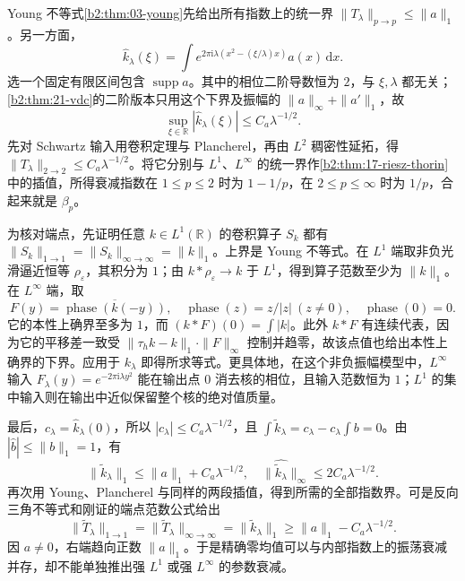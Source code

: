 \begin{solution}
Young 不等式\cref{b2:thm:03-young}先给出所有指数上的统一界 \(\|T_\lambda\|_{p\to p}\leq\|a\|_1\)。另一方面，
\[
 \widehat k_\lambda(\xi)
 =\int e^{2\pi\mathrm i\lambda(x^2-(\xi/\lambda)x)}a(x)\,\mathrm dx.
\]
选一个固定有限区间包含 \(\operatorname{supp}a\)。其中的相位二阶导数恒为 \(2\)，与 \(\xi,\lambda\) 都无关；\cref{b2:thm:21-vdc}的二阶版本只用这个下界及振幅的 \(\|a\|_\infty+\|a'\|_1\)，故
\[
 \sup_{\xi\in\mathbb R}|\widehat k_\lambda(\xi)|\leq C_a\lambda^{-1/2}.
\]
先对 Schwartz 输入用卷积定理与 Plancherel，再由 \(L^2\) 稠密性延拓，得 \(\|T_\lambda\|_{2\to2}\leq C_a\lambda^{-1/2}\)。将它分别与 \(L^1\)、\(L^\infty\) 的统一界作\cref{b2:thm:17-riesz-thorin}中的插值，所得衰减指数在 \(1\leq p\leq2\) 时为 \(1-1/p\)，在 \(2\leq p\leq\infty\) 时为 \(1/p\)，合起来就是 \(\beta_p\)。

为核对端点，先证明任意 \(k\in L^1(\mathbb R)\) 的卷积算子 \(S_k\) 都有
\(\|S_k\|_{1\to1}=\|S_k\|_{\infty\to\infty}=\|k\|_1\)。上界是 Young 不等式。在 \(L^1\) 端取非负光滑逼近恒等 \(\rho_\varepsilon\)，其积分为 \(1\)；由 \(k*\rho_\varepsilon\to k\) 于 \(L^1\)，得到算子范数至少为 \(\|k\|_1\)。在 \(L^\infty\) 端，取
\[
 F(y)=\overline{\operatorname{phase}(k(-y))},\quad
 \operatorname{phase}(z)=z/|z|\ (z\ne0),\quad \operatorname{phase}(0)=0.
\]
它的本性上确界至多为 \(1\)，而 \((k*F)(0)=\int|k|\)。此外 \(k*F\) 有连续代表，因为它的平移差一致受 \(\|\tau_hk-k\|_1\cdot\|F\|_\infty\) 控制并趋零，故该点值也给出本性上确界的下界。应用于 \(k_\lambda\) 即得所求等式。更具体地，在这个非负振幅模型中，\(L^\infty\) 输入 \(F_\lambda(y)=e^{-2\pi\mathrm i\lambda y^2}\) 能在输出点 \(0\) 消去核的相位，且输入范数恒为 \(1\)；\(L^1\) 的集中输入则在输出中近似保留整个核的绝对值质量。

最后，\(c_\lambda=\widehat k_\lambda(0)\)，所以 \(|c_\lambda|\leq C_a\lambda^{-1/2}\)，且 \(\int\widetilde k_\lambda=c_\lambda-c_\lambda\int b=0\)。由 \(|\widehat b|\leq\|b\|_1=1\)，有
\[
 \|\widetilde k_\lambda\|_1\leq\|a\|_1+C_a\lambda^{-1/2},\quad
 \|\widehat{\widetilde k_\lambda}\|_\infty
 \leq2C_a\lambda^{-1/2}.
\]
再次用 Young、Plancherel 与同样的两段插值，得到所需的全部指数界。可是反向三角不等式和刚证的端点范数公式给出
\[
 \|\widetilde T_\lambda\|_{1\to1}
 =\|\widetilde T_\lambda\|_{\infty\to\infty}
 =\|\widetilde k_\lambda\|_1
 \geq\|a\|_1-C_a\lambda^{-1/2}.
\]
因 \(a\ne0\)，右端趋向正数 \(\|a\|_1\)。于是精确零均值可以与内部指数上的振荡衰减并存，却不能单独推出强 \(L^1\) 或强 \(L^\infty\) 的参数衰减。
\end{solution}

